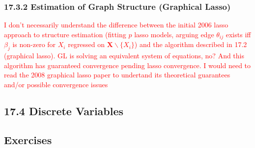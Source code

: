 \documentclass[11pt]{article}
\begin{document}
\subsubsection{17.3.2 Estimation of Graph Structure (Graphical Lasso) }

\textcolor{red}{I don't necessarily understand the difference between the initial 2006 lasso approach to structure estimation (fitting $p$ lasso models, arguing edge $\theta_{ij}$ exists iff $\beta_j$ is non-zero for $X_i$ regressed on $\mathbf{X}\backslash\{X_i\}$) and the algorithm described in 17.2 (graphical lasso). GL is  solving an equivalent system of equations, no? And this algorithm has guaranteed convergence pending lasso convergence. I would need to read the 2008 graphical lasso paper to undertand its theoretical guarantees and/or possible convergence issues
}

\subsection*{17.4 Discrete Variables}

\newpage 

\subsection*{Exercises}
\end{document}
